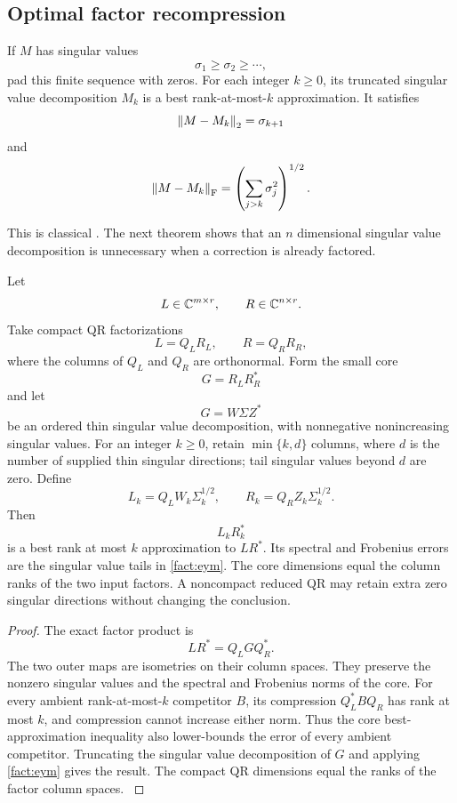 \subsection{Optimal factor recompression}\label{main:subsection:004}

\begin{standardfact}\label{main:standardfact:001}\label{fact:eym}
If \(M\) has singular values
\[
\sigma_1\geq\sigma_2\geq\cdots,
\]
pad this finite sequence with zeros. For each integer $k\ge0$, its truncated singular value decomposition $M_k$ is a best rank-at-most-$k$ approximation. It satisfies
\[
\left\lVert M-M_k\right\rVert_2=\sigma_{k+1}
\]
and
\[
\left\lVert M-M_k\right\rVert_{\rm F}
=
\left(
\sum_{j>k}\sigma_j^2
\right)^{1/2}.
\]
\end{standardfact}

This is classical \cite{EckartYoung1936,Mirsky1960}. The next theorem shows that an \(n\) dimensional singular value decomposition is unnecessary when a correction is already factored.

\begin{theorem}\label{main:theorem:011}\label{thm:small_core_recompression}
Let
\[
L\in\CC^{m\times r},
\qquad
R\in\CC^{n\times r}.
\]
Take compact QR factorizations
\[
L=Q_LR_L,
\qquad
R=Q_RR_R,
\]
where the columns of \(Q_L\) and \(Q_R\) are orthonormal. Form the small core
\[
G=R_LR_R^*
\]
and let
\[
G=W\Sigma Z^*
\]
be an ordered thin singular value decomposition, with nonnegative nonincreasing singular values. For an integer $k\ge0$, retain $\min\{k,d\}$ columns, where $d$ is the number of supplied thin singular directions; tail singular values beyond $d$ are zero. Define
\[
L_k=Q_LW_k\Sigma_k^{1/2},
\qquad
R_k=Q_RZ_k\Sigma_k^{1/2}.
\]
Then
\[
L_kR_k^*
\]
is a best rank at most \(k\) approximation to \(LR^*\). Its spectral and Frobenius errors are the singular value tails in \cref{fact:eym}. The core dimensions equal the column ranks of the two input factors. A noncompact reduced QR may retain extra zero singular directions without changing the conclusion.
\end{theorem}

\begin{proof}\label{main:proof:023}
The exact factor product is
\[
LR^*
=
Q_LGQ_R^*.
\]
The two outer maps are isometries on their column spaces. They preserve the nonzero singular values and the spectral and Frobenius norms of the core. For every ambient rank-at-most-$k$ competitor $B$, its compression $Q_L^*BQ_R$ has rank at most $k$, and compression cannot increase either norm. Thus the core best-approximation inequality also lower-bounds the error of every ambient competitor. Truncating the singular value decomposition of \(G\) and applying \cref{fact:eym} gives the result. The compact QR dimensions equal the ranks of the factor column spaces.
\label{main:proof:023:end}\end{proof}

